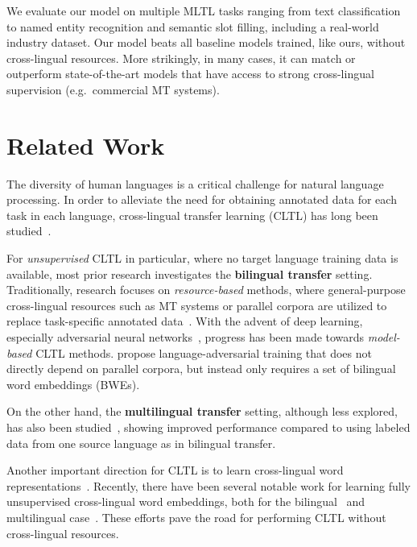 \documentclass[11pt,a4paper]{article}
\begin{document}
We evaluate our model on multiple MLTL tasks ranging from text classification to named entity recognition and semantic slot filling, including a real-world industry dataset. Our model beats all baseline models trained, like ours, without cross-lingual resources. More strikingly, in many cases, it can match or outperform state-of-the-art models that have access to strong cross-lingual supervision (e.g.~commercial MT systems).
 \section{Related Work}\label{sec:relatedwork}

The diversity of human languages is a critical challenge for natural language processing.
In order to alleviate the need for obtaining annotated data for each task in each language, cross-lingual transfer learning (CLTL) has long been studied~\citep[][\textit{inter alia}]{H01-1035,10.1007/978-3-540-45175-4_13}.

For \emph{unsupervised} CLTL in particular, where no target language training data is available, most prior research investigates the \textbf{bilingual transfer} setting.
Traditionally, research focuses on \emph{resource-based} methods, where general-purpose cross-lingual resources such as MT systems or parallel corpora are utilized to replace task-specific annotated data~\cite{P09-1027,P10-1114}.
With the advent of deep learning, especially adversarial neural networks~\cite{NIPS2014_5423_gan,Ganin:2016:DTN:2946645.2946704}, progress has been made towards \emph{model-based} CLTL methods.
\citet{chen2016adan} propose language-adversarial training that does not directly depend on parallel corpora, but instead only requires a set of bilingual word embeddings (BWEs).

On the other hand,  the \textbf{multilingual transfer} setting, although less explored, has also been studied~\cite{McDonald:2011:MTD:2145432.2145440,naseem-etal-2012-selective,tackstrom-etal-2013-target,10.1007/978-3-319-05476-6_3,zhang-barzilay-2015-hierarchical,AAAI1612236}, showing improved performance compared to using labeled data from one source language as in bilingual transfer.

Another important direction for CLTL is to learn cross-lingual word representations~\cite{klementiev-titov-bhattarai:2012:PAPERS,zou-EtAl:2013:EMNLP,DBLP:journals/corr/MikolovLS13}.
Recently, there have been several notable work for learning fully unsupervised cross-lingual word embeddings, both for the bilingual~\citep{zhang-EtAl:2017:Long5,lample2018word,P18-1073} and multilingual case~\citep{chen2018umwe}.
These efforts pave the road for performing CLTL without cross-lingual resources.
\end{document}
